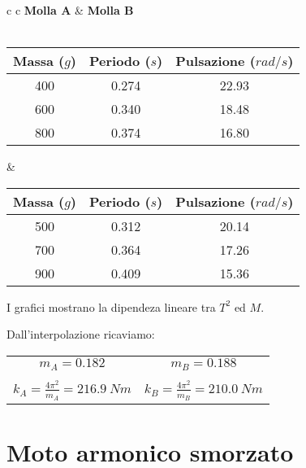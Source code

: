 \begin{center}

\begin{tabular}{c c}
\textbf{Molla A} & \hspace{2cm} \textbf{Molla B}\\
\\
\begin{tabular}{c | c| c}
Massa ($g$) & Periodo ($s$) & Pulsazione ($rad/s$)\\
\midrule
400 & 0.274 & 22.93\\
600 & 0.340 & 18.48\\
800 & 0.374 & 16.80\\
\end{tabular}

& \hspace{2cm}

\begin{tabular}{c | c | c}
Massa ($g$) & Periodo ($s$) & Pulsazione ($rad/s$)\\
\midrule
500 & 0.312 & 20.14\\
700 & 0.364 & 17.26\\
900 & 0.409 & 15.36\\
\end{tabular}

\end{tabular}

\end{center}

I grafici mostrano la dipendeza lineare tra $T^2$ ed $M$.


Dall'interpolazione ricaviamo:
\begin{center}
\begin{tabular}{c c}
$m_A=0.182$ & \hspace{3cm} $m_B=0.188$\\ 
\\
$k_A=\displaystyle{\frac{4\pi^2}{m_A}}=216.9\ Nm$ & \hspace{3cm} $k_B=\displaystyle{\frac{4\pi^2}{m_B}}=210.0\ Nm$ \\
\end{tabular}
\end{center}

\section{Moto armonico smorzato}

